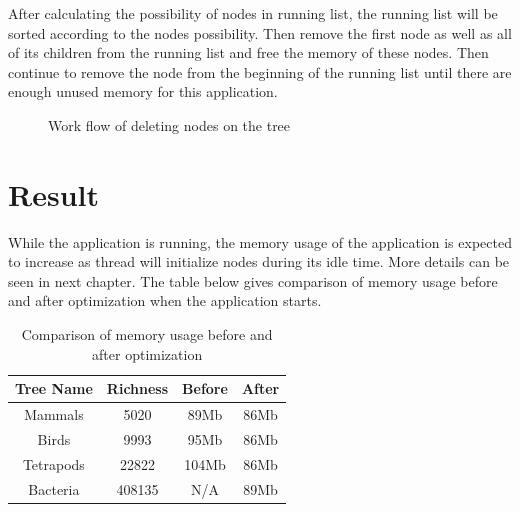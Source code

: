 \documentclass[a4paper,11pt,twoside]{report}
\begin{document}
After calculating the possibility of nodes in running list, the running list will be sorted according to the nodes possibility. Then remove the first node as well as all of its children from the running list and free the memory of these nodes. Then continue to remove the node from the beginning of the running list until there are enough unused memory for this application.

\begin{figure} [H]
\caption{Work flow of deleting nodes on the tree}
\end{figure}

\section{Result}

While the application is running, the memory usage of the application is expected to increase as thread will initialize nodes during its idle time. More details can be seen in next chapter. The table below gives comparison of memory usage before and after optimization when the application starts.

\begin{table} [H]
	\centering %
	\begin{tabular}{|c c c c|} %
		\hline %
		Tree Name & Richness  & Before & After\\ %
		\hline  %
		Mammals & 5020 & 89Mb   & 86Mb\\  %
		\hline
		Birds & 9993 &  95Mb & 86Mb\\
		\hline
		Tetrapods & 22822 & 104Mb & 86Mb\\ 
		\hline %
		Bacteria & 408135 & N/A & 89Mb \\ [1ex] %
		\hline
	\end{tabular}
	\label{table:nonlin} %
	\caption{Comparison of memory usage before and after optimization} %
\end{table}
\end{document}
